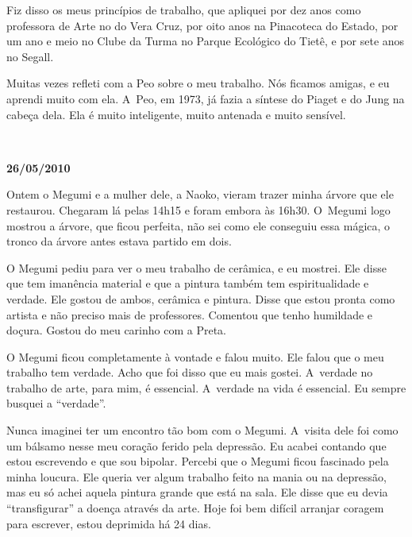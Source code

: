 Fiz disso os meus princípios de trabalho, que apliquei por dez anos como
professora de Arte no   do Vera Cruz, por oito anos na Pinacoteca
do Estado, por um ano e meio no Clube da Turma no Parque Ecológico do
Tietê, e por sete anos no Segall.

Muitas vezes refleti com a Peo sobre o meu trabalho. Nós ficamos amigas,
e eu aprendi muito com ela. A~Peo, em 1973, já fazia a síntese do Piaget
e do Jung na cabeça dela. Ela é muito inteligente, muito antenada e
muito sensível.

\begin{center}\asterisc{}​\end{center}


\begin{flushright}\textbf{26/05/2010}\end{flushright}


Ontem o Megumi e a mulher dele, a Naoko, vieram trazer minha árvore que
ele restaurou. Chegaram lá pelas 14h15 e foram embora às 16h30. O~Megumi
logo mostrou a árvore, que ficou perfeita, não sei como ele conseguiu
essa mágica, o tronco da árvore antes estava partido em dois.

O Megumi pediu para ver o meu trabalho de cerâmica, e eu mostrei. Ele
disse que tem imanência material e que a pintura também tem
espiritualidade e verdade. Ele gostou de ambos, cerâmica e pintura.
Disse que estou pronta como artista e não preciso mais de professores.
Comentou que tenho humildade e doçura. Gostou do meu carinho com a
Preta.

O Megumi ficou completamente à vontade e falou muito. Ele falou que o
meu trabalho tem verdade. Acho que foi disso que eu mais gostei. A~verdade no trabalho de arte, para mim, é essencial. A~verdade na vida é
essencial. Eu sempre busquei a ``verdade''.

Nunca imaginei ter um encontro tão bom com o Megumi. A~visita dele foi
como um bálsamo nesse meu coração ferido pela depressão. Eu acabei
contando que estou escrevendo e que sou bipolar. Percebi que o Megumi
ficou fascinado pela minha loucura. Ele queria ver algum trabalho feito
na mania ou na depressão, mas eu só achei aquela pintura grande que está
na sala. Ele disse que eu devia ``transfigurar'' a doença através da
arte. Hoje foi bem difícil arranjar coragem para escrever, estou
deprimida há 24 dias.

\begin{center}\asterisc{}​\end{center}


